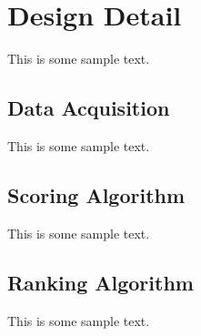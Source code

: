 \chapter{Design Detail}

This is some sample text.

\section{Data Acquisition}

This is some sample text.

\section{Scoring Algorithm}

This is some sample text.

\section{Ranking Algorithm}

This is some sample text.
